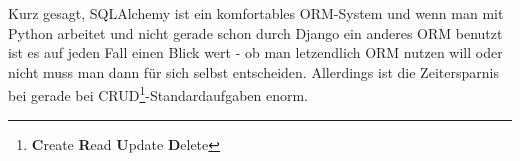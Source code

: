 Kurz gesagt, SQLAlchemy ist ein komfortables ORM-System und wenn man mit Python
arbeitet und nicht gerade schon durch Django ein anderes ORM benutzt ist es auf
jeden Fall einen Blick wert - ob man letzendlich ORM nutzen will oder nicht muss
man dann für sich selbst entscheiden. Allerdings ist die Zeitersparnis bei
gerade bei CRUD\footnote{\textbf{C}reate \textbf{R}ead \textbf{U}pdate
\textbf{D}elete}-Standardaufgaben enorm.
